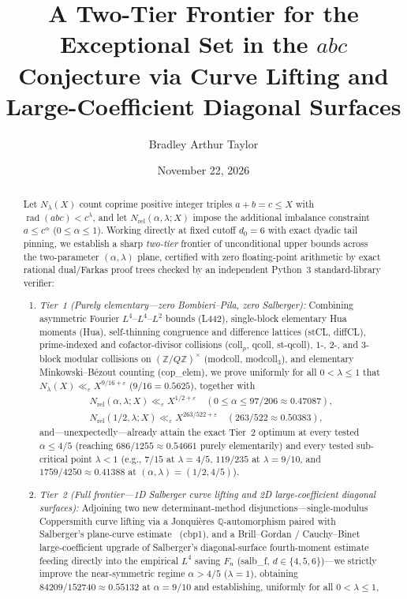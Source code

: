 \documentclass[11pt,a4paper]{amsart}
\title[A Two-Tier Frontier for the $abc$ Exceptional Set]{A Two-Tier Frontier for the Exceptional Set in the $abc$ Conjecture via Curve Lifting and Large-Coefficient Diagonal Surfaces}
\author{Bradley Arthur Taylor}
\date{November 22, 2026}
\theoremstyle{plain}
\theoremstyle{definition}
\theoremstyle{remark}
\DeclareMathOperator{\rad}{rad}
\newcommand{\Z}{\mathbb{Z}}
\newcommand{\Q}{\mathbb{Q}}
\newcommand{\eps}{\varepsilon}
\begin{document}
\begin{abstract}
Let $N_\lambda(X)$ count coprime positive integer triples $a+b=c \le X$ with $\rad(abc) < c^\lambda$, and let $N_{\mathrm{rel}}(\alpha,\lambda;X)$ impose the additional imbalance constraint $a \le c^\alpha$ ($0 \le \alpha \le 1$). Working directly at fixed cutoff $d_0 = 6$ with exact dyadic tail pinning, we establish a sharp \emph{two-tier} frontier of unconditional upper bounds across the two-parameter $(\alpha,\lambda)$ plane, certified with zero floating-point arithmetic by exact rational dual/Farkas proof trees checked by an independent Python~3 standard-library verifier:
\begin{enumerate}[label=(\arabic*),itemsep=1pt,topsep=2pt]
\item \emph{Tier~1 (Purely elementary—zero Bombieri--Pila, zero Salberger):} Combining asymmetric Fourier $L^4$--$L^4$--$L^2$ bounds (\textsf{L442}), single-block elementary Hua moments (\textsf{Hua}), self-thinning congruence and difference lattices (\textsf{stCL}, \textsf{diffCL}), prime-indexed and cofactor-divisor collisions (\textsf{coll}$_p$, \textsf{qcoll}, \textsf{st-qcoll}), $1$-, $2$-, and $3$-block modular collisions on $(\Z/Q\Z)^\times$ (\textsf{modcoll}, \textsf{modcoll}$_3$), and elementary Minkowski--B\'ezout counting (\textsf{cop\_elem}), we prove uniformly for all $0 < \lambda \le 1$ that $N_\lambda(X) \ll_\eps X^{9/16 + \eps}$ ($9/16 = 0.5625$), together with
\begin{gather*}
  N_{\mathrm{rel}}(\alpha,\lambda;X) \ll_\eps X^{1/2+\eps} \quad (0 \le \alpha \le 97/206 \approx 0.47087), \\
  N_{\mathrm{rel}}(1/2,\lambda;X) \ll_\eps X^{263/522+\eps} \quad (263/522 \approx 0.50383),
\end{gather*}
and—unexpectedly—already attain the exact Tier~2 optimum at every tested $\alpha \le 4/5$ (reaching $686/1255 \approx 0.54661$ purely elementarily) and every tested sub-critical point $\lambda < 1$ (e.g., $7/15$ at $\lambda = 4/5$, $119/235$ at $\lambda = 9/10$, and $1759/4250 \approx 0.41388$ at $(\alpha,\lambda) = (1/2, 4/5)$).
\item \emph{Tier~2 (Full frontier—1D Salberger curve lifting and 2D large-coefficient diagonal surfaces):} Adjoining two new determinant-method disjunctions—single-modulus Coppersmith curve lifting via a Jonqui\`eres $\Q$-automorphism paired with Salberger's plane-curve estimate~\cite[Theorem~1.2]{Salberger2023} (\textsf{cbp1}), and a Brill--Gordan / Cauchy--Binet large-coefficient upgrade of Salberger's diagonal-surface fourth-moment estimate~\cite[Theorem~3.16 and Corollary~6.5]{Salberger2023} feeding directly into the empirical $L^4$ saving $F_n$ (\textsf{salb\_f}, $d \in \{4,5,6\}$)—we strictly improve the near-symmetric regime $\alpha > 4/5$ ($\lambda = 1$), obtaining $84209/152740 \approx 0.55132$ at $\alpha = 9/10$ and establishing, uniformly for all $0 < \lambda \le 1$,

\end{enumerate}
\end{abstract}
\end{document}
